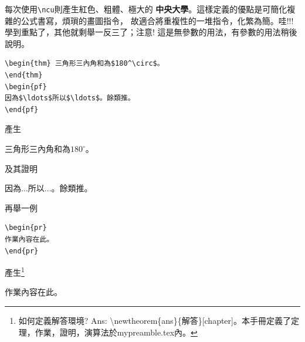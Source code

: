 \newcommand{\ncu}{{\color{red} \bf \Huge 中央大學}}
每次使用\verb|\ncu|則產生紅色、粗體、極大的\ncu。這樣定義的優點是可簡化複雜的公式書寫，煩瑣的畫圖指令， 故適合將重複性的一堆指令，化繁為簡。哇$!!!$學到重點了，其他就剩舉一反三了；注意$!$
這是無參數的用法，有參數的用法稍後說明。
\begin{Verbatim}[frame=single,firstline=1,label=Theorem]
\begin{thm} 三角形三內角和為$180^\circ$。
\end{thm}
\begin{pf}
因為$\ldots$所以$\ldots$。餘類推。
\end{pf} 
\end{Verbatim}
產生
\begin{thm} 三角形三內角和為$180^\circ$。  
\end{thm}
及其證明
\begin{pf}
因為$\ldots$所以$\ldots$。餘類推。
\end{pf} 
再舉一例
\begin{Verbatim}[frame=single,firstline=1,label=Problem]
\begin{pr}
作業內容在此。
\end{pr}
\end{Verbatim}
產生\footnote{如何定義解答環境? Ans: \textbackslash newtheorem\{ans\}\{解答\}[chapter]。本手冊定義了定理，作業，證明，演算法於mypreamble.tex內。}
\begin{pr}
作業內容在此。
\end{pr}

